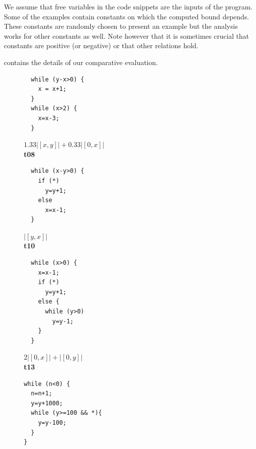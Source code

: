 \documentclass[nocopyrightspace,preprint]{sigplanconf}
\newcommand{\pref}[1]{\prettyref{#1}}
\begin{document}
{We assume that free variables in the code snippets are the inputs of
the program. Some of the examples contain constants on which the
computed bound depends.  These constants are randomly chosen to
present an example but the analysis works for other constants as well.
Note however that it is sometimes crucial that constants are positive
(or negative) or that other relations hold.

\pref{tab:eval} contains the details of our comparative evaluation.


\begin{figure}[t!]
\setlength{\progwidth}{.24\linewidth}
  \centering

  \begin{minipage}[b]{\progwidth}
    \begin{center}
   \begin{lstlisting}
  while (y-x>0) {
    x = x+1;
  }
  while (x>2) {
    x=x-3;
  }
   \end{lstlisting}

$1.33|[x,y]| + 0.33|[0,x]|$
\\[.7\baselineskip]
      {\bf t08}
    \end{center}
  \end{minipage}
%
%
%
  \begin{minipage}[b]{\progwidth}
    \begin{center}
   \begin{lstlisting}
  while (x-y>0) {
    if (*)
      y=y+1;
    else
      x=x-1;
  }
   \end{lstlisting}

$|[y,x]|$
\\[.7\baselineskip]
      {\bf t10}
    \end{center}
  \end{minipage}
%
%
%
  \begin{minipage}[b]{\progwidth}
    \begin{center}
   \begin{lstlisting}
  while (x>0) {
    x=x-1;
    if (*)
      y=y+1;
    else {
      while (y>0)
        y=y-1;
    }
  }
   \end{lstlisting}

$2|[0,x]| + |[0,y]|$
\\[.7\baselineskip]
      {\bf t13}
    \end{center}
  \end{minipage}
%
%
%
  \begin{minipage}[b]{\progwidth}
    \begin{center}
   \begin{lstlisting}
while (n<0) {
  n=n+1;
  y=y+1000;
  while (y>=100 && *){
    y=y-100;
  }
}
   \end{lstlisting}


\end{center}
\end{minipage}
\end{figure}}
\end{document}
